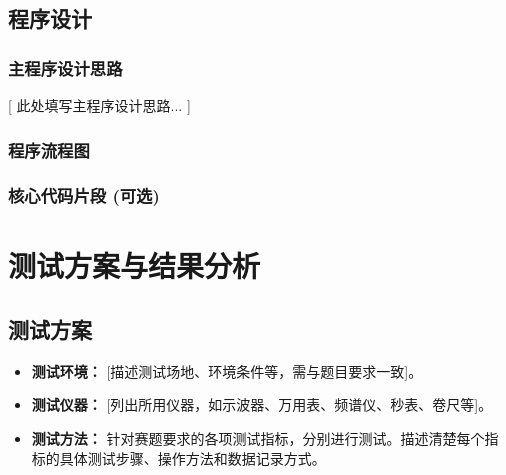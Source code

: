\documentclass[UTF8,zihao=-4]{ctexart}
\begin{document}
\subsection{程序设计}
\subsubsection{主程序设计思路}
    [ 此处填写主程序设计思路... ]

\subsubsection{程序流程图}
    
\subsubsection{核心代码片段 (可选)}

\section{测试方案与结果分析}
\subsection{测试方案}
    \begin{itemize}
        \item \textbf{测试环境：} [描述测试场地、环境条件等，需与题目要求一致]。
        \item \textbf{测试仪器：} [列出所用仪器，如示波器、万用表、频谱仪、秒表、卷尺等]。
        \item \textbf{测试方法：} 针对赛题要求的各项测试指标，分别进行测试。描述清楚每个指标的具体测试步骤、操作方法和数据记录方式。
    \end{itemize}
\end{document}
